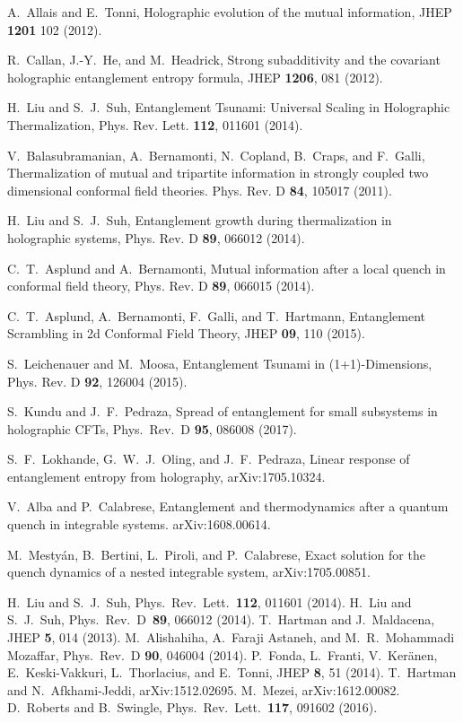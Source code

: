\documentclass[twocolumn,superscriptaddress,prb,10pt]{revtex4-1}
\begin{document}
\begin{thebibliography}{99}
	A.~Allais  and E.~Tonni, 
	Holographic evolution of the mutual information, 
	JHEP {\bf 1201} 102 (2012).

	R.~Callan, J.-Y.~He, and M.~Headrick, Strong subadditivity and the covariant holographic
	entanglement entropy formula, 
	JHEP {\bf 1206},   081 (2012).

	H.~Liu  and S.~J.~Suh, Entanglement Tsunami: Universal Scaling in Holographic Thermalization, 
	Phys. Rev. Lett.  {\bf 112},  011601 (2014).


	V.~Balasubramanian, A.~Bernamonti, N.~Copland, B.~Craps, and F.~Galli,  
	Thermalization of mutual and tripartite information in strongly coupled two dimensional conformal field theories.
	Phys. Rev. D {\bf 84},  105017 (2011).

	H.~Liu and S.~J.~Suh, Entanglement growth during thermalization in holographic systems, 
	Phys. Rev. D {\bf 89},  066012 (2014).
	

	C.~T.~Asplund and  A.~Bernamonti, Mutual information after a local quench in conformal field theory,
	Phys. Rev. D {\bf 89}, 066015 (2014).

	 C.~T.~Asplund, A.~Bernamonti, F.~Galli, and T.~Hartmann, 
	 Entanglement Scrambling in 2d Conformal Field Theory, JHEP {\bf 09}, 110 (2015).

	 S.~Leichenauer and  M.~Moosa, Entanglement Tsunami in (1+1)-Dimensions,  Phys. Rev. D {\bf 92}, 126004 (2015).
 

	S.~Kundu and J.~F.~Pedraza,  Spread of entanglement for small subsystems in holographic CFTs, 
	Phys.\ Rev.\ D {\bf 95}, 086008 (2017). 

S.~F.~Lokhande, G.~W.~J.~Oling, and J.~F.~Pedraza, 
Linear response of entanglement entropy from holography, 
arXiv:1705.10324. 

V.~Alba and P.~Calabrese, Entanglement and thermodynamics after a quantum quench 
in integrable systems. arXiv:1608.00614. 


        M.~Mesty\'an, B.~Bertini, L.~Piroli, and P.~Calabrese, 
        Exact solution for the quench dynamics of a nested integrable system, 
	arXiv:1705.00851. 

H.~Liu and S.~J.~Suh, Phys.\ Rev.\ Lett.\ {\bf 112}, 011601 (2014). 
H.~Liu and S.~J.~Suh, Phys.\ Rev.\ D\ {\bf 89}, 066012 (2014). 
T.~Hartman and J.~Maldacena, JHEP {\bf 5}, 014 (2013). 
M.~Alishahiha,  A.~Faraji  Astaneh, and  M.~R.~Mohammadi 
Mozaffar, Phys.\ Rev.\ D {\bf 90}, 046004 (2014).  
P.~Fonda, L.~Franti, V.~Ker\"anen, E.~Keski-Vakkuri, 
L.~Thorlacius, and   E.~Tonni, JHEP {\bf 8}, 51 (2014). 
T.~Hartman and N.~Afkhami-Jeddi, arXiv:1512.02695. 
M.~Mezei, arXiv:1612.00082. D.~Roberts and B.~Swingle, Phys.\ 
Rev.\ Lett.\ {\bf 117}, 091602 (2016). 


\end{thebibliography}
\end{document}
